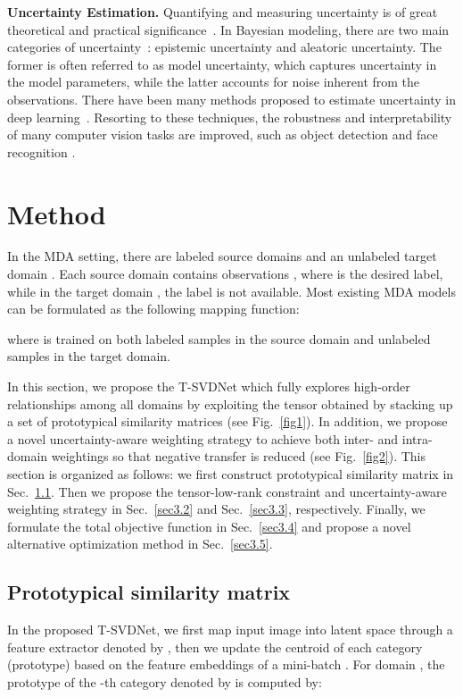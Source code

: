 \documentclass[10pt,twocolumn,letterpaper]{article}
\begin{document}
\textbf{Uncertainty Estimation.} 
Quantifying and measuring uncertainty is of great theoretical and practical significance~\cite{faber2005on,kiureghian2009aleatory}. In Bayesian modeling, there are two main categories of uncertainty~\cite{kendall2017what}: epistemic uncertainty and aleatoric uncertainty. The former is often referred to as model uncertainty, which captures uncertainty in the model parameters, while the latter accounts for noise inherent from the observations. There have been many methods proposed to estimate uncertainty in deep learning~\cite{blundell2015weight,gal2016dropout,cipolla2018multi}. Resorting to these techniques, the robustness and interpretability of many computer vision tasks are improved, such as object detection \cite{choi2019gaussian,kraus2019uncertainty} and face recognition \cite{chang2020data}.        
\section{Method}
In the MDA setting, there are  labeled source domains  and an unlabeled target domain . Each source domain  contains  observations , where  is the desired label, while in the target domain , the label  is not available. Most existing MDA models can be formulated as the following mapping function:

where  is trained on both labeled samples  in the source domain and unlabeled samples  in the target domain. \par
In this section, we propose the T-SVDNet which fully explores high-order relationships among all domains by exploiting the tensor obtained by stacking up a set of prototypical similarity matrices (see Fig.~\ref{fig1}). In addition, we propose a novel uncertainty-aware weighting strategy to achieve both inter- and intra-domain weightings so that negative transfer is reduced (see Fig.~\ref{fig2}). This section is organized as follows: we first construct prototypical similarity matrix in Sec.~\ref{sec3.1}. Then we propose the tensor-low-rank constraint and uncertainty-aware weighting strategy in Sec.~\ref{sec3.2} and Sec.~\ref{sec3.3}, respectively. Finally, we formulate the total objective function in Sec.~\ref{sec3.4} and propose a novel alternative optimization method in Sec.~\ref{sec3.5}.
\subsection{Prototypical similarity matrix}
\label{sec3.1}
In the proposed T-SVDNet, we first map input image into latent space through a feature extractor denoted by , then we update the centroid of each category (prototype) based on the feature embeddings of a mini-batch \cite{pan2019transferrable,xie2018learning,wang2020learning}. For domain , the prototype of the -th category denoted by  is computed by: 
 
\end{document}
